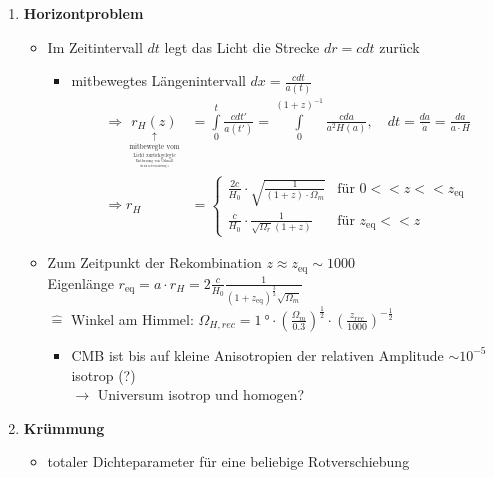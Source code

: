 \begin{itemize}
		\begin{enumerate}[label={(\arabic*)}]
			\item \textbf{Horizontproblem}
				\begin{itemize}[label={$\to$}]
					\item Im Zeitintervall $dt$ legt das Licht die Strecke $dr=cdt$ zurück
						\begin{itemize}[label={$\Rightarrow$}]
							\item mitbewegtes Längenintervall $dx=\frac{cdt}{a(t)}$
								\begin{align*}
									\Rightarrow\ \underset{\underset{\underset{\underset{\underset{\text{bis zur Rotverschiebung } z}{\text{Entfernung von Urknall}}}{\text{Licht zurückgelegte}}}{\text{mitbewegte vom}}}{\uparrow}}{r_H(z)}&=\int\limits_0^t\frac{cdt'}{a(t')}=\int\limits_0^{(1+z)^{-1}}\frac{cda}{a^2 H(a)},\quad dt=\frac{da}{\dot{a}}=\frac{da}{a\cdot H}\\
									\Rightarrow r_H&=\begin{cases} \frac{2c}{H_0}\cdot\sqrt{\frac{1}{(1+z)\cdot\Omega_m}} & \text{für }0<<z<<z_\text{eq}\\ \frac{c}{H_0}\cdot\frac{1}{\sqrt{\Omega_r}(1+z)} & \text{für }z_\text{eq}<<z\end{cases}
								\end{align*}
						\end{itemize}
					\item Zum Zeitpunkt der Rekombination $z\approx z_\text{eq}\sim 1000$\\
						Eigenlänge $r_\text{eq}=a\cdot r_H=2\frac{c}{H_0}\frac{1}{(1+z_\text{eq})^{\frac{3}{2}}\sqrt{\Omega_m}}$\\
						$\hat{=}$ Winkel am Himmel: $\Omega_{H,rec}=\SI{1}{\degree}\cdot\left(\frac{\Omega_m}{\num{0.3}}\right)^{\frac{1}{2}}\cdot\left(\frac{z_{rec}}{1000}\right)^{-\frac{1}{2}}$
						\begin{itemize}[label={$\Rightarrow$}]
							\item CMB ist bis auf kleine Anisotropien der relativen Amplitude $\sim 10^{-5}$ isotrop \lightning (?)\\
								$\to$ Universum isotrop und homogen?
						\end{itemize}
				\end{itemize}
			\item \textbf{Krümmung}
				\begin{itemize}[label={$\to$}]
					\item totaler Dichteparameter für eine beliebige Rotverschiebung

\end{itemize}
\end{enumerate}
\end{itemize}
